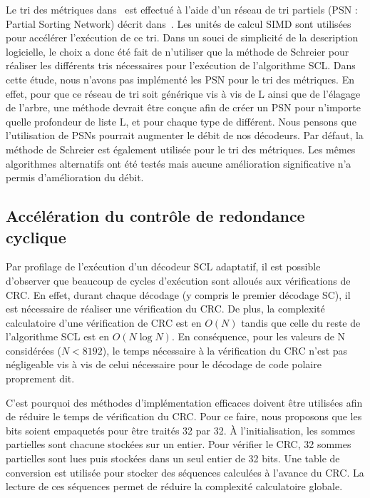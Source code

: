 Le tri des métriques dans~\cite{sarkis_fast_2016} est effectué à l'aide d'un réseau de tri partiels (PSN : Partial Sorting Network) décrit dans~\cite{furtak2007using}. Les unités de calcul SIMD sont utilisées pour accélérer l'exécution de ce tri. 
Dans un souci de simplicité de la description logicielle, le choix a donc été fait de n'utiliser que la méthode de Schreier pour réaliser les différents tris nécessaires pour l'exécution de l'algorithme SCL.
Dans cette étude, nous n'avons pas implémenté les PSN pour le tri des métriques. En effet, pour que ce réseau de tri soit générique vis à vis de $\mathrm{L}$ ainsi que de l'élagage de l'arbre, une méthode devrait être conçue afin de créer un PSN pour n'importe quelle profondeur de liste $\mathrm{L}$, et pour chaque type de \noeud différent. Nous pensons que l'utilisation de PSNs pourrait augmenter le débit de nos décodeurs.
Par défaut, la méthode de Schreier est également utilisée pour le tri des métriques. Les mêmes algorithmes alternatifs ont été testés mais aucune amélioration significative n'a permis d'amélioration du débit.

\subsection{Accélération du contrôle de redondance cyclique}

Par profilage de l'exécution d'un décodeur SCL adaptatif, il est possible d'observer que beaucoup de cycles d'exécution sont alloués aux vérifications de CRC.
En effet, durant chaque décodage (y compris le premier décodage SC), il est nécessaire de réaliser une vérification du CRC.
De plus, la complexité calculatoire d'une vérification de CRC est en $O(N)$ tandis que celle du reste de l'algorithme SCL est en $O(N\log N)$.
En conséquence, pour les valeurs de N considérées ($N<8192$), le temps nécessaire à la vérification du CRC n'est pas négligeable vis à vis de celui nécessaire pour le décodage de code polaire proprement dit.

C'est pourquoi des méthodes d'implémentation efficaces doivent être utilisées afin de réduire le temps de vérification du CRC.
Pour ce faire, nous proposons que les bits soient empaquetés pour être traités 32 par 32.
\`A l'initialisation, les sommes partielles sont chacune stockées sur un entier.
Pour vérifier le CRC, 32 sommes partielles sont lues puis stockées dans un seul entier de 32 bits.
Une table de conversion est utilisée pour stocker des séquences calculées à l'avance du CRC.
La lecture de ces séquences permet de réduire la complexité calculatoire globale.

